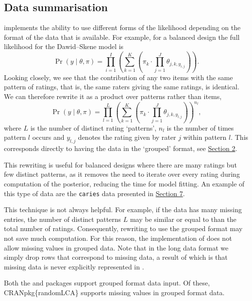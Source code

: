 \hypertarget{data-summarisation}{%
\subsection{Data summarisation}\label{data-summarisation}}

 implements the
ability to use different forms of the likelihood depending on the format
of the data that is available. For example, for a balanced design the
full likelihood for the Dawid--Skene model is
\[
\Pr(y \mid \theta, \pi)
= \prod_{i = 1}^{I}
  \left(\sum_{k = 1}^{K}
        \left(\pi_{k} \cdot \prod_{j = 1}^{J}
                            \theta_{j, k, y_{i, j}}\right)\right).
\]
Looking closely, we see that the contribution of any two items with the
same pattern of ratings, that is, the same raters giving the same
ratings, is identical. We can therefore rewrite it as a product over
patterns rather than items,
\[
\Pr(y \mid \theta, \pi)
= \prod_{l = 1}^{L}
  \left(\sum_{k = 1}^{K}
        \left(\pi_{k} \cdot \prod_{j = 1}^{J}
                            \theta_{j, k, y_{l, j}}\right)\right)^{n_l},
\]
where \(L\) is the number of distinct rating `patterns', \(n_l\) is the
number of times pattern \(l\) occurs and \(y_{l, j}\) denotes the rating
given by rater \(j\) within pattern \(l\). This corresponds directly to
having the data in the `grouped' format, see \protect\hyperlink{sec:data-formats}{Section 2}.

This rewriting is useful for balanced designs where there are many
ratings but few distinct patterns, as it removes the need to iterate
over every rating during computation of the posterior, reducing the time
for model fitting. An example of this type of data are the \texttt{caries} data
presented in \protect\hyperlink{sec:usage}{Section 7}.

This technique is not always helpful. For example, if the data has many
missing entries, the number of distinct patterns \(L\) may be similar or
equal to than the total number of ratings. Consequently, rewriting to
use the grouped format may not save much computation. For this reason,
the implementation of  does not allow
missing values in grouped data. Note that in the long data format we
simply drop rows that correspond to missing data, a result of which is
that missing data is never explicitly represented in .

Both the  and  packages support grouped
format data input. Of these, CRANpkg\{randomLCA\} supports missing values in
grouped format data.

